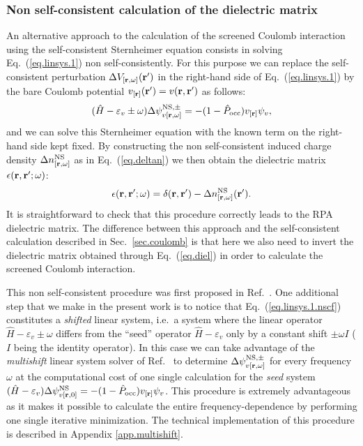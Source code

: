 \documentclass[twocolumn,prb,showpacs,superscriptaddress]{revtex4}
\def\w{\omega}
\def\H{\hat{H}}
\def\P{\hat{P}_{\rm occ}}
\def\E{\varepsilon}
\def\r{{\bf r}}
\def\rp{{\bf r^\prime}}
\begin{document}
\subsubsection{Non self-consistent calculation of the dielectric matrix}\label{sec.diel.nscf}

An alternative approach to the calculation of the screened Coulomb interaction
using the self-consistent Sternheimer equation consists in solving Eq.\ (\ref{eq.linsys.1}) non self-consistently.
For this purpose we can replace the self-consistent perturbation $\Delta V_{[\r,\w]}(\rp)$
in the right-hand side of Eq.\ (\ref{eq.linsys.1}) by the bare Coulomb potential
$v_{[\r]}(\rp)=v(\r,\rp)$ as follows:
  \begin{equation}\label{eq.linsys.1.nscf}
  (\H-\E_v\pm\w) \Delta \psi^{{\rm NS},\pm}_{v[\r,\w]}  = -(1-\P)  v_{[\r]} \psi_v, 
  \end{equation}
and we can solve this Sternheimer equation with the known term on the right-hand side
kept fixed. By constructing the non self-consistent induced charge density $\Delta n^{\rm NS}_{[\r,\w]}$ as in Eq.\ (\ref{eq.deltan})
we then obtain the dielectric matrix $\epsilon(\r,\rp;\w)$:
  \begin{equation}\label{eq.diel}
  \epsilon(\r,\rp;\w) = \delta(\r,\rp) - \Delta n^{\rm NS}_{[\r,\w]}(\rp).
  \end{equation}
It is straightforward to check that this procedure correctly leads to the RPA
dielectric matrix.\cite{hl86-prb}
The difference between this approach and the self-consistent calculation described in
Sec.\ \ref{sec.coulomb} is that here we also need to invert the dielectric matrix obtained
through Eq.\ (\ref{eq.diel}) in order to calculate the screened Coulomb interaction.

This non self-consistent procedure was first proposed in Ref.\ .
One additional step that we make in the present work is to notice that Eq.\ (\ref{eq.linsys.1.nscf})
constitutes a {\it shifted} linear system, i.e.\ a system where the linear operator
$\H-\E_v\pm\w$ differs from the ``seed'' operator $\H-\E_v$ only by a constant shift $\pm\w I$ 
($I$ being the identity operator). 
In this case we can take
advantage of the {\it multishift} linear system solver of Ref.\ 
to determine $\Delta \psi^{{\rm NS},\pm}_{v[\r,\w]}$ for every frequency $\w$
at the computational cost of one single calculation for the {\it seed} system $(\H-\E_v) \Delta \psi^{{\rm NS}}_{v[\r,0]}  = -(1-\P)  v_{[\r]} \psi_v$.
This procedure is extremely advantageous as it makes it possible to calculate the entire frequency-dependence 
by performing one single iterative minimization. 
The technical implementation of this procedure is described in Appendix \ref{app.multishift}.
\end{document}
